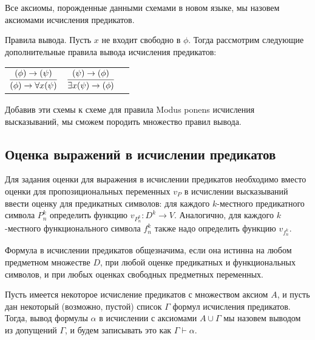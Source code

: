 Все аксиомы, порожденные данными схемами в новом языке, мы назовем аксиомами исчисления
предикатов.

Правила вывода.
Пусть $x$ не входит свободно в $\phi$. Тогда рассмотрим следующие дополнительные
правила вывода исчисления предикатов:

\begin{tabular}{lll}
$\infer{(\phi) \rightarrow \forall{x}(\psi)}{(\phi) \rightarrow (\psi)}$ &
$\infer{\exists{x}(\psi) \rightarrow (\phi)}{(\psi) \rightarrow (\phi)}$
\end{tabular}

Добавив эти схемы к схеме для правила Modus ponens исчисления высказываний,
мы сможем породить множество правил вывода.


\subsection{Оценка выражений в исчислении предикатов}

Для задания оценки для выражения в исчислении предикатов необходимо
вместо оценки для пропозициональных переменных $v_P$ в исчислении 
высказываний ввести оценку для предикатных символов: для каждого 
$k$-местного предикатного символа $P^k_n$ определить функцию 
$v_{P^k_n}: D^k \rightarrow V$. Аналогично, для каждого $k$-местного 
функционального символа $f^k_n$ также надо определить функцию 
$v_{f^k_n}$.

\begin{definition}Формула в исчислении предикатов общезначима, если она 
истинна на любом предметном множестве $D$, при любой оценке предикатных
и функциональных символов, и при любых оценках свободных предметных
переменных.
\end{definition}

\begin{definition}Пусть имеется некоторое исчисление предикатов с множеством
аксиом $A$, и пусть дан некоторый (возможно, пустой) список $\Gamma$ 
формул исчисления предикатов. Тогда, вывод формулы $\alpha$
в исчислении с аксиомами $A \cup \Gamma$ мы назовем выводом из 
допущений $\Gamma$, и будем записывать это как $\Gamma \vdash \alpha$.
\end{definition}


